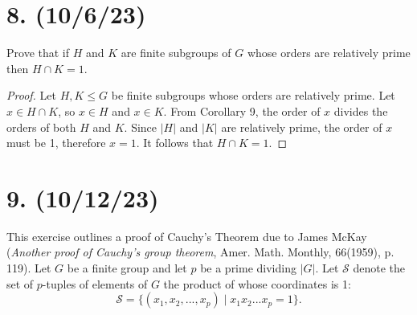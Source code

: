\documentclass{article}
\begin{document}
\section*{8. (10/6/23)}

Prove that if $H$ and $K$ are finite subgroups of $G$ whose orders are relatively prime then $H \cap K = 1$.

\begin{proof}
    Let $H, K \leq G$ be finite subgroups whose orders are relatively prime. Let $x \in H \cap K$, so $x \in H$ and $x \in K$. From Corollary 9, the order of $x$ divides the orders of both $H$ and $K$. Since $|H|$ and $|K|$ are relatively prime, the order of $x$ must be 1, therefore $x = 1$. It follows that $H \cap K = 1$.
\end{proof}

\section*{9. (10/12/23)}

This exercise outlines a proof of Cauchy's Theorem due to James McKay (\emph{Another proof of Cauchy's group theorem}, Amer. Math. Monthly, 66(1959), p. 119). Let $G$ be a finite group and let $p$ be a prime dividing $|G|$. Let $\mathcal{S}$ denote the set of $p$-tuples of elements of $G$ the product of whose coordinates is 1:
\begin{equation*}
    \mathcal{S} = \{ (x_1, x_2, ..., x_p) \mid x_1 x_2 ... x_p = 1 \}.
\end{equation*}
\end{document}
